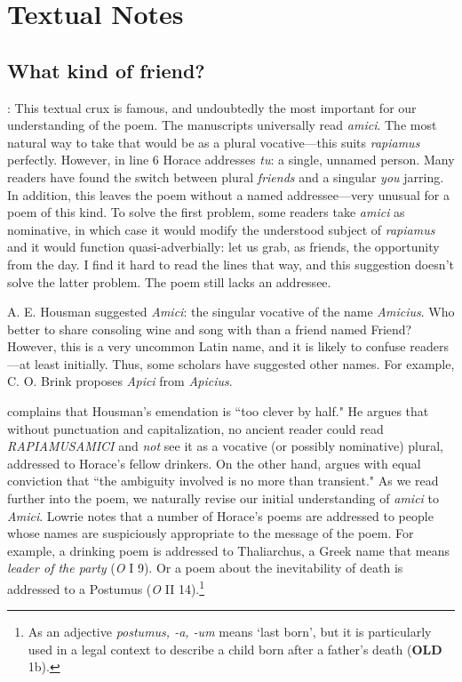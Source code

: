 \chapter*{Textual Notes}

\section*{What kind of friend?}


: This textual crux is famous, and undoubtedly the most important for our understanding of the poem.  The manuscripts universally read \textit{amici}.  The most natural way to take that would be as a plural vocative---this suits \textit{rapiamus} perfectly.  However, in line 6 Horace addresses \textit{tu}: a single, unnamed person.  Many readers have found the switch between plural \textit{friends} and a singular \textit{you} jarring.  In addition, this leaves the poem without a named addressee---very unusual for a poem of this kind.  To solve the first problem, some readers take \textit{amici} as nominative, in which case it would modify the understood subject of \textit{rapiamus} and it would function quasi-adverbially: let us grab, as friends, the opportunity from the day.  I find it hard to read the lines that way, and this suggestion doesn't solve the latter problem.  The poem still lacks an addressee.

A. E. Housman suggested \textit{Amici}: the singular vocative of the name \textit{Amicius}.  Who better to share consoling wine and song with than a friend named Friend?  However, this is a very uncommon Latin name, and it is likely to confuse readers---at least initially.  Thus, some scholars have suggested other names.  For example, C. O. Brink proposes \textit{Apici} from \textit{Apicius}.

\citet[205]{gaskin2013} complains that Housman's emendation is ``too clever by half."  He argues that without punctuation and capitalization, no ancient reader could read \textit{RAPIAMUSAMICI} and \textit{not} see it as a vocative (or possibly nominative) plural, addressed to Horace's fellow drinkers.  On the other hand, \citet[417, note 14]{lowrie1992} argues with equal conviction that ``the ambiguity involved is no more than transient."  As we read further into the poem, we naturally revise our initial understanding of \textit{amici} to \textit{Amici}.  Lowrie notes that a number of Horace's poems are addressed to people whose names are suspiciously appropriate to the message of the poem.  For example,  a drinking poem is addressed to Thaliarchus, a Greek name that means \textit{leader of the party} (\textit{O} I 9).  Or a poem about the inevitability of death is addressed to a Postumus (\textit{O} II 14).\footnote{As an adjective \textit{postumus, -a, -um} means `last born', but it is particularly used in a legal context to describe a child born after a father's death (\textbf{OLD} 1b).}

